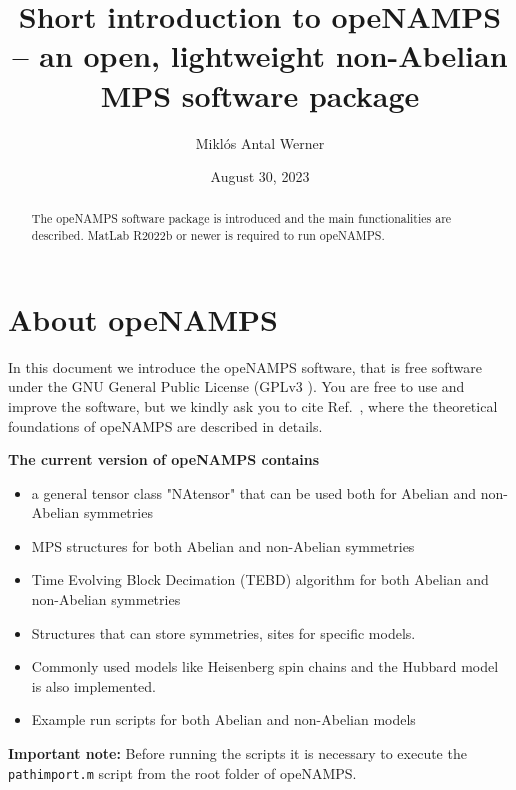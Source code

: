 \documentclass[aps,prb,twocolumn,showpacs,preprintnumbers,amsmath,amssymb, superscriptaddressm, nofootinbib]{revtex4-2}   %
\begin{document}
\title{Short introduction to \textbf{opeNAMPS} -- an open, lightweight non-Abelian MPS software package}

\author{Miklós Antal Werner}
\date{August 30, 2023}
 
\begin{abstract}
 The opeNAMPS software package is introduced and the main functionalities are described. MatLab R2022b or newer is required to run opeNAMPS. 

\end{abstract}
\maketitle

\section{About opeNAMPS}
In this document we introduce the opeNAMPS software, that is free software under the GNU General Public License (GPLv3 \cite{GPLv3}). You are free to use and improve the software, but we kindly ask you to cite Ref.~, where the theoretical foundations of opeNAMPS are described in details.  

\textbf{The current version of opeNAMPS contains} 
\begin{itemize}
    \item a general tensor class "NAtensor" that can be used both for Abelian and non-Abelian symmetries
    \item MPS structures for both Abelian and non-Abelian symmetries
    \item Time Evolving Block Decimation (TEBD) algorithm for both Abelian and non-Abelian symmetries
    \item Structures that can store symmetries, sites for specific models.
    \item Commonly used models like Heisenberg spin chains and the Hubbard model is also implemented.
    \item Example run scripts for both Abelian and non-Abelian models
\end{itemize}
\textbf{Important note:} Before running the scripts it is necessary to execute the \verb|pathimport.m| script from the root folder of opeNAMPS.
\end{document}
